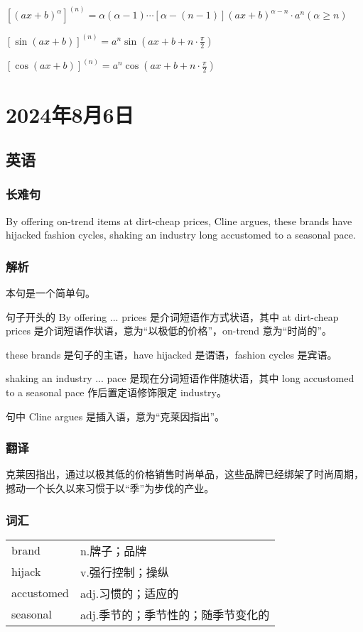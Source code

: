 \documentclass[UTF8]{ctexart}
\begin{document}
$[(ax+b)^\alpha]^{(n)}=\alpha(\alpha-1)\cdots[\alpha-(n-1)](ax+b)^{\alpha -n}\cdot a^n(\alpha\ge n)$
\begin{multicols}{2}
      $[\sin(ax+b)]^{(n)}=a^n\sin(ax+b+n\cdot\frac{\pi}{2})$

      $[\cos(ax+b)]^{(n)}=a^n\cos(ax+b+n\cdot\frac{\pi}{2})$
\end{multicols}
\section{2024年8月6日}
\subsection{英语}
\subsubsection{长难句}
By offering on-trend items at dirt-cheap prices, Cline argues, these brands have hijacked fashion cycles, shaking an industry long accustomed to a seasonal pace.
\subsubsection{解析}
本句是一个简单句。

句子开头的 By offering ... prices 是介词短语作方式状语，其中 at dirt-cheap prices 是介词短语作状语，意为“以极低的价格”，on-trend 意为“时尚的”。

these brands 是句子的主语，have hijacked 是谓语，fashion cycles 是宾语。

shaking an industry ... pace 是现在分词短语作伴随状语，其中 long accustomed to a seasonal pace 作后置定语修饰限定 industry。

句中 Cline argues 是插入语，意为“克莱因指出”。
\subsubsection{翻译}
克莱因指出，通过以极其低的价格销售时尚单品，这些品牌已经绑架了时尚周期，撼动一个长久以来习惯于以“季”为步伐的产业。
\subsubsection{词汇}
\begin{table}[h]
      \centering
      \begin{tabular}{p{}p{}}
            brand      & n.牌子；品牌             \\
            hijack     & v.强行控制；操纵           \\
            accustomed & adj.习惯的；适应的         \\
            seasonal   & adj.季节的；季节性的；随季节变化的
      \end{tabular}
\end{table}
\end{document}
